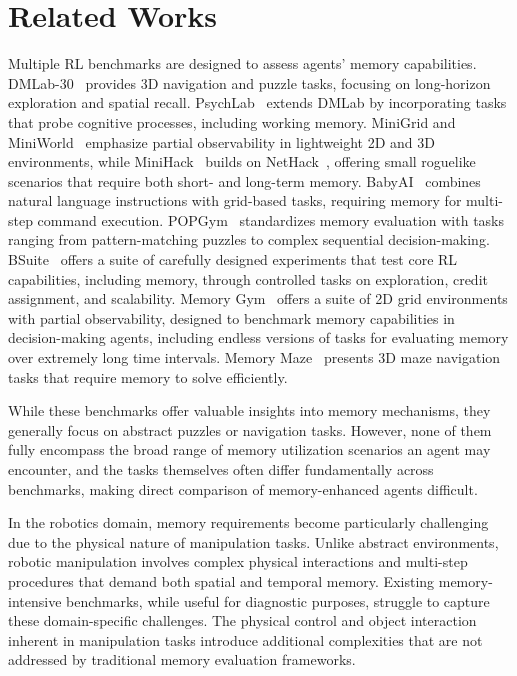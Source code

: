 \section{Related Works}
\label{sec:related_works}

Multiple RL benchmarks are designed to assess agents' memory capabilities. DMLab-30~\citep{dmlab} provides 3D navigation and puzzle tasks, focusing on long-horizon exploration and spatial recall. PsychLab~\citep{psychlab} extends DMLab by incorporating tasks that probe cognitive processes, including working memory. MiniGrid and MiniWorld~\citep{minigrid_miniworld} emphasize partial observability in lightweight 2D and 3D environments, while MiniHack~\citep{minihack} builds on NetHack~\citep{nethack}, offering small roguelike scenarios that require both short- and long-term memory. BabyAI~\citep{babyai} combines natural language instructions with grid-based tasks, requiring memory for multi-step command execution. POPGym~\citep{popgym2023} standardizes memory evaluation with tasks ranging from pattern-matching puzzles to complex sequential decision-making. BSuite~\citep{bsuite} offers a suite of carefully designed experiments that test core RL capabilities, including memory, through controlled tasks on exploration, credit assignment, and scalability. 
Memory Gym~\citep{pleines2023memory} offers a suite of 2D grid environments with partial observability, designed to benchmark memory capabilities in decision-making agents, including endless versions of tasks for evaluating memory over extremely long time intervals.
Memory Maze~\citep{memory_maze} presents 3D maze navigation tasks that require memory to solve efficiently.

While these benchmarks offer valuable insights into memory mechanisms, they generally focus on abstract puzzles or navigation tasks.  However, none of them fully encompass the broad range of memory utilization scenarios an agent may encounter, and the tasks themselves often differ fundamentally across benchmarks, making direct comparison of memory-enhanced agents difficult.

In the robotics domain, memory requirements become particularly challenging due to the physical nature of manipulation tasks. Unlike abstract environments, robotic manipulation involves complex physical interactions and multi-step procedures that demand both spatial and temporal memory. Existing memory-intensive benchmarks, while useful for diagnostic purposes, struggle to capture these domain-specific challenges. The physical control and object interaction inherent in manipulation tasks introduce additional complexities that are not addressed by traditional memory evaluation frameworks.

